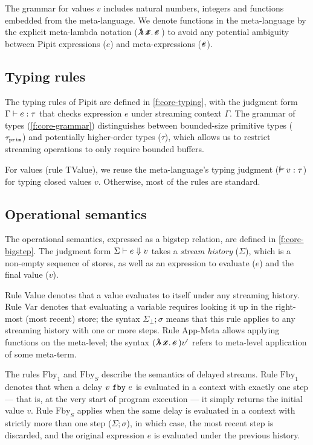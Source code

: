 \documentclass[sigplan,screen]{acmart}
\begin{document}
The grammar for values $v$ includes natural numbers, integers and functions embedded from the \fstar{} meta-language.
We denote functions in the meta-language by the explicit meta-lambda notation ($\mlamX{}$) to avoid any potential ambiguity between Pipit expressions ($e$) and meta-expressions ($\metafy{e}$).

\subsection{Typing rules}
\label{ss:typing-rules}

The typing rules of Pipit are defined in \autoref{f:core-typing}, with the judgment form $\Gamma \vdash e : \tau$ that checks expression $e$ under streaming context $\Gamma$.
The grammar of types (\autoref{f:core-grammar}) distinguishes between bounded-size primitive types ($\tau_{\texttt{prim}}$) and potentially higher-order types ($\tau$), which allows us to restrict streaming operations to only require bounded buffers.

For values (rule TValue), we reuse the \fstar{} meta-language's typing judgment ($\mtyping{}{v}{\tau}$) for typing closed values $v$.
Otherwise, most of the rules are standard.

\subsection{Operational semantics}
\label{ss:operational-semantics}

The operational semantics, expressed as a bigstep relation, are defined in \autoref{f:core-bigstep}.
The judgment form $\Sigma \vdash e \Downarrow v$ takes a \emph{stream history} ($\Sigma$), which is a non-empty sequence of stores, as well as an expression to evaluate ($e$) and the final value ($v$).

Rule Value denotes that a value evaluates to itself under any streaming history.
Rule Var denotes that evaluating a variable requires looking it up in the right-most (most recent) store; the syntax $\Sigma_\bot; \sigma$ means that this rule applies to any streaming history with one or more steps.
Rule App-Meta allows applying functions on the meta-level; the syntax $(\mlamX{}) v'$ refers to meta-level application of some meta-term.

The rules $\mbox{Fby}_1$ and $\mbox{Fby}_S$ describe the semantics of delayed streams.
Rule $\mbox{Fby}_1$ denotes that when a delay $v~\texttt{fby}~e$ is evaluated in a context with exactly one step --- that is, at the very start of program execution --- it simply returns the initial value $v$.
Rule $\mbox{Fby}_S$ applies when the same delay is evaluated in a context with strictly more than one step ($\Sigma; \sigma$), in which case, the most recent step is discarded, and the original expression $e$ is evaluated under the previous history.
\end{document}
